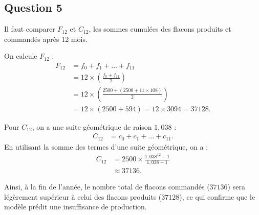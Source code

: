 \documentclass[10pt]{article}
\begin{document}
\subsection*{Question 5}

Il faut comparer $F_{12}$ et $C_{12}$, les sommes cumulées des flacons produits et commandés après 12 mois.

On calcule $F_{12}$ :
\begin{align*}
	F_{12} &= f_0 + f_1 + \dots + f_{11} \\
	&= 12 \times \left( \frac{f_0 + f_{11}}{2} \right) \\
	&= 12 \times \left( \frac{2500 + (2500 + 11 \times 108)}{2} \right) \\
	&= 12 \times (2500 + 594) = 12 \times 3094 = 37128.
\end{align*}

Pour $C_{12}$, on a une suite géométrique de raison $1,038$ :
\begin{align*}
	C_{12} &= c_0 + c_1 + \dots + c_{11}.
\end{align*}
En utilisant la somme des termes d'une suite géométrique, on a :
\begin{align*}
	C_{12} &= 2500 \times \frac{1,038^{12} - 1}{1,038 - 1} \\
	&\approx 37136.
\end{align*}

Ainsi, à la fin de l'année, le nombre total de flacons commandés ($37136$) sera légèrement supérieur à celui des flacons produits ($37128$), ce qui confirme que le modèle prédit une insuffisance de production.
\end{document}
